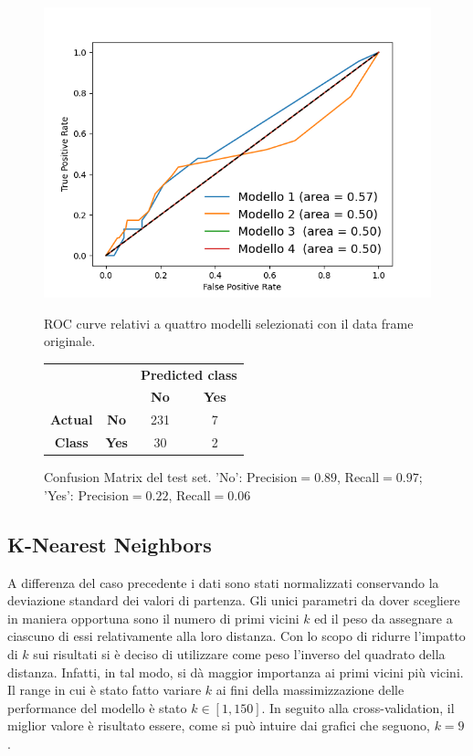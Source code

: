 \documentclass[a4paper,9pt]{article}
\begin{document}
\begin{figure}[H]
  \begin{minipage}{.45\textwidth}
    \centering
    \includegraphics[width=\textwidth]{ROC_CURVEsenzaYes.png}
    \caption{ROC curve relativi a quattro modelli selezionati con il data frame originale.}
  \end{minipage}
  \centering
  \begin{minipage}{.45\textwidth}
       \centering
\begin{tabular}{cc|cc}
\toprule
&\bfseries      & \multicolumn{2}{c}{\bfseries Predicted class} \\
& & \bfseries No & \bfseries Yes \\
\midrule
\bfseries Actual&\bfseries No  & 231 & 7  \\
\bfseries Class &\bfseries Yes & 30 & 2  \\
\bottomrule
\end{tabular}
\caption{Confusion Matrix del test set. 'No': Precision$=0.89$, Recall$=0.97$; 'Yes': Precision$=0.22$, Recall$=0.06$}
  \end{minipage}

  \end{figure}







\subsection{K-Nearest Neighbors}
A differenza del caso precedente i dati sono stati normalizzati conservando la deviazione standard dei valori di partenza.
Gli unici parametri da dover scegliere in maniera opportuna sono il numero di primi vicini $k$ ed il peso da assegnare a ciascuno di essi relativamente alla loro distanza. Con lo scopo di ridurre l'impatto di $k$ sui risultati si è deciso di utilizzare come peso l'inverso del quadrato della distanza. Infatti, in tal modo, si dà maggior importanza ai primi vicini più vicini.
Il range in cui è stato fatto variare $k$ ai fini della massimizzazione delle performance del modello è stato $k \in [1,150]$. In seguito alla cross-validation, il miglior valore è risultato essere, come si può intuire dai grafici che seguono, $k=9$.
\end{document}
